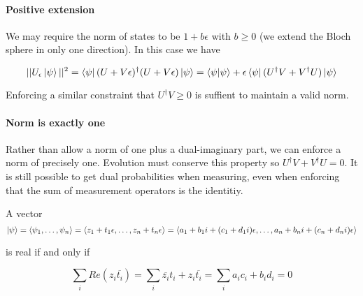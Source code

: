 \documentclass{article}
\newcommand{\e}{\epsilon}
\renewcommand{\bar}{\overline}
\begin{document}
\paragraph{Positive extension} We may require the norm of states to be $1 + b \e$ with $b \geq 0$ (we extend the Bloch sphere in only one direction). In this case we have

\begin{equation}
||U_{\e} \ket{\psi}||^2 = \bra{\psi} (U + V \e)^\dagger (U + V \e) \ket{\psi} = \braket{\psi | \psi} + \e \bra{\psi}(U^\dagger V + V^\dagger U) \ket{\psi}
\end{equation}

Enforcing a similar constraint that $U^\dagger V \geq 0$ is suffient to maintain a valid norm.

\paragraph{Norm is exactly one} Rather than allow a norm of one plus a dual-imaginary part, we can enforce a norm of precisely one.
Evolution must conserve this property so $U^\dagger V + V^\dagger U = 0$.
It is still possible to get dual probabilities when measuring, even when enforcing that the sum of measurement operators is the identitiy.

A vector
\begin{equation}
\ket{\psi} = \braket{\psi_1, \dots, \psi_n} = \braket{z_1 + t_1 \e, \dots, z_n + t_n \e} = \braket{a_1 + b_1i + (c_1 + d_1i)\e, \dots, a_n + b_ni + (c_n + d_ni)\e}
\end{equation}

is real if and only if

\begin{equation}
\sum_i Re(z_i \bar{t_i}) = \sum_i \bar{z_i} t_i + z_i \bar{t_i} = \sum_i a_ic_i + b_id_i = 0
\end{equation}



\end{document}
